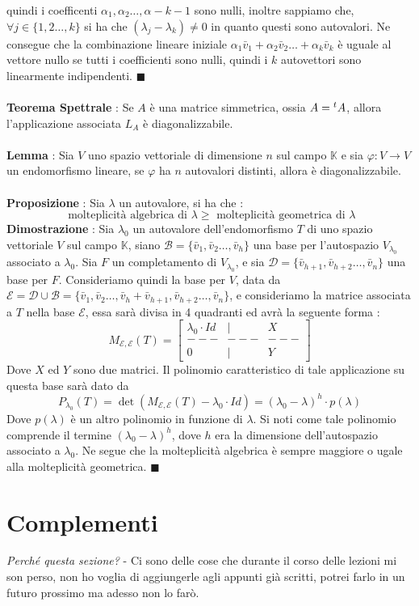 \documentclass[12pt, letterpaper]{article}
\newcommand{\K}{{\mathbb K}}
\newcommand{\E}{{\mathcal E}}
\newcommand{\B}{{\mathcal B}}
\newcommand{\ve}{{\bar v}}
\newcommand{\acc}{\\\hphantom{}\\}
\begin{document}
quindi i coefficenti \(\alpha_1,\alpha_2\dots,\alpha-{k-1}\) sono nulli, inoltre sappiamo che, 
\(\forall j\in\{1,2\dots,k\}\) si ha che \((\lambda_j-\lambda_k)\ne 0\) in quanto questi sono autovalori. Ne consegue che 
la combinazione lineare iniziale  \(\alpha_1\ve_1+\alpha_2\ve_2\dots+\alpha_k\ve_k\) è uguale al vettore nullo se 
tutti i coefficienti sono nulli, quindi i \(k\) autovettori sono linearmente indipendenti. \(\blacksquare\)\acc 
\textbf{Teorema Spettrale} : Se \(A\) è una matrice simmetrica, ossia \(A=\text{\hphantom{}}^tA\), allora 
l'applicazione associata \(L_A\) è diagonalizzabile.\acc 
\textbf{Lemma} : Sia \(V\) uno spazio vettoriale di dimensione \(n\) sul campo \(\K\)  e sia \(\varphi:V\rightarrow V\) un endomorfismo 
lineare, se \(\varphi\) ha \(n\) autovalori distinti, allora è diagonalizzabile.\acc 
\textbf{Proposizione} : Sia \(\lambda\) un autovalore, si ha che :
$$\text{ molteplicità algebrica di }\lambda\ge \text{ molteplicità geometrica di }\lambda$$ 
\textbf{Dimostrazione} : Sia \(\lambda_0\) un autovalore dell'endomorfismo \(T\) di uno spazio vettoriale \(V\) sul campo 
\(\K\), siano \(\B=\{\ve_1,\ve_2\dots,\ve_h\}\) una base per l'autospazio \(V_{\lambda_0}\) associato a \(\lambda_0\). 
Sia \(F\) un completamento di \(V_{\lambda_0}\), e sia \(\mathcal{D}=\{\ve_{h+1},\ve_{h+2}\dots,\ve_n\}\) una base per \(F\).
Consideriamo quindi la base per \(V\), data da \(\E=\mathcal{D}\cup \B=\{\ve_1,\ve_2\dots,\ve_h+\ve_{h+1},\ve_{h+2}\dots,\ve_n\}\), 
e consideriamo la matrice associata a \(T\) nella base \(\E\), essa sarà divisa in 4 quadranti ed avrà la seguente 
forma : $$M_{\E,\E}(T)=
\begin{bmatrix}
    \lambda_0\cdot Id&|  &X\\
    ---&---&---\\
    0&|&Y
\end{bmatrix}
$$
Dove \(X\) ed \(Y\) sono due matrici. Il polinomio caratteristico di tale applicazione su questa base sarà dato da
$$P_{\lambda_0}(T)=\det(M_{\E,\E}(T)-\lambda_0 \cdot Id)=(\lambda_0-\lambda)^h \cdot p(\lambda)$$
Dove \(p(\lambda)\) è un altro polinomio in funzione di \(\lambda\). Si noti come tale polinomio 
comprende il termine \((\lambda_0-\lambda)^h\), dove \(h\) era la dimensione dell'autospazio associato 
a \(\lambda_0\). Ne segue che la molteplicità algebrica è sempre maggiore o ugale alla 
molteplicità geometrica. \(\blacksquare\)\newpage 
\section{Complementi}
\textit{Perché questa sezione?} - Ci sono delle cose che durante il corso delle lezioni mi son perso, non ho voglia di 
aggiungerle agli appunti già scritti, potrei farlo in un futuro prossimo ma adesso non lo farò.
\end{document}
